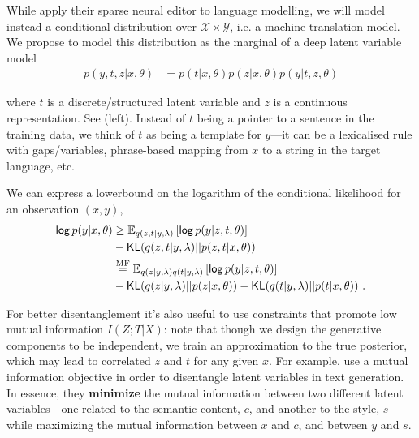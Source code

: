 While \citet{he2020LearningSparsePrototypes} apply their sparse neural editor
to language modelling, we will model instead a conditional
distribution over $\mathcal{X} \times \mathcal{Y}$, i.e. a
machine translation model. We propose to model this distribution
as the marginal of a deep latent variable model
\begin{align}
    p(y, t, z|x, \theta) & =
    p(t | x, \theta)p(z |x, \theta)p(y |t, z, \theta)
\end{align}

\noindent where $t$ is a discrete/structured latent variable and $z$ is a
continuous representation. See  (left).
Instead of $t$ being a pointer to a sentence in the training data, we
think of $t$ as being a template for $y$---it can be a lexicalised
rule with gaps/variables, phrase-based mapping from $x$ to a string
in the target language, etc.

We can express a lowerbound on the logarithm of the conditional likelihood for an observation $(x,y)$,
\begin{align}
    \operatorname*{\mathsf{log}} p(y|x, \theta) & \ge \mathbb E_{q(z,t|y,\lambda)}\left[ \operatorname*{\mathsf{log}} p(y|z,t, \theta) \right] \nonumber                                \\
                        & - \operatorname{\mathsf{KL}}(q(z, t|y,\lambda) || p(z, t|x, \theta))                                                                 \\
                        & \overset{\text{MF}}{=} \mathbb E_{q(z|y,\lambda)q(t|y,\lambda)}\left[ \operatorname*{\mathsf{log}} p(y|z,t, \theta) \right] \nonumber \\
                        & - \operatorname{\mathsf{KL}}(q(z|y,\lambda) || p(z|x,\theta)) - \operatorname{\mathsf{KL}}(q(t|y,\lambda) || p(t|x, \theta)) ~.
\end{align}

For better disentanglement it's also useful to use constraints that
promote low mutual information $I(Z;T|X)$: note that though we design
the generative components to be independent, we train an
approximation to the true posterior, which may lead to correlated $z$
and $t$ for any given $x$. For example,
\citet{chengImprovingDisentangledText2020} use a mutual information
objective in order to disentangle latent variables in text
generation. In essence, they {\bf minimize} the mutual information
between two different latent variables---one related to the semantic
content, $c$, and another to the style, $s$---while maximizing the
mutual information between $x$ and $c$, and between $y$ and $s$.

